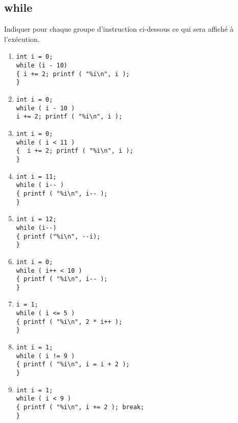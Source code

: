 \begin{multicols}{2}
\subsection{while}

Indiquer pour chaque groupe d'instruction ci-dessous ce qui sera affiché à l'exécution.

\begin{enumerate}[label=(\roman*)]

    \item \begin{lstlisting}
int i = 0;
while (i - 10)
{ i += 2; printf ( "%i\n", i );
}\end{lstlisting}

    \item \begin{lstlisting}
int i = 0;
while ( i - 10 )
i += 2; printf ( "%i\n", i );
\end{lstlisting}

    \item \begin{lstlisting}
int i = 0;
while ( i < 11 )
{  i += 2; printf ( "%i\n", i );
}
\end{lstlisting}

    \item \begin{lstlisting}
int i = 11;
while ( i-- )
{ printf ( "%i\n", i-- );
}
\end{lstlisting}

    \item \begin{lstlisting}
int i = 12;
while (i--)
{ printf ("%i\n", --i);
}
\end{lstlisting}

    \item \begin{lstlisting}
int i = 0;
while ( i++ < 10 )
{ printf ( "%i\n", i-- );
}
\end{lstlisting}

    \item \begin{lstlisting}
i = 1;
while ( i <= 5 )
{ printf ( "%i\n", 2 * i++ );
}
\end{lstlisting}

    \item \begin{lstlisting}
int i = 1;
while ( i != 9 )
{ printf ( "%i\n", i = i + 2 );
}
\end{lstlisting}

    \item \begin{lstlisting}
int i = 1;
while ( i < 9 )
{ printf ( "%i\n", i += 2 ); break;
}
\end{lstlisting}


\end{enumerate}
\end{multicols}
